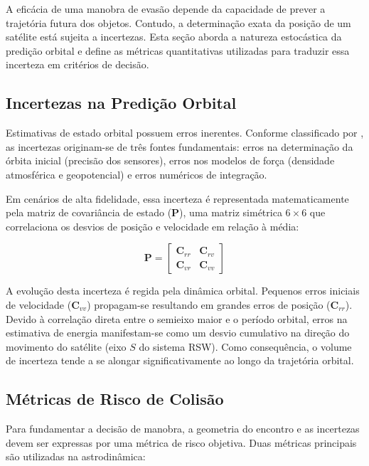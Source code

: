 A eficácia de uma manobra de evasão depende da capacidade de prever a trajetória futura dos objetos. Contudo, a determinação exata da posição de um satélite está sujeita a incertezas. Esta seção aborda a natureza estocástica da predição orbital e define as métricas quantitativas utilizadas para traduzir essa incerteza em critérios de decisão.

\subsection{Incertezas na Predição Orbital}
\label{subsec:incertezas_predicao}

Estimativas de estado orbital possuem erros inerentes. Conforme classificado por , as incertezas originam-se de três fontes fundamentais: erros na determinação da órbita inicial (precisão dos sensores), erros nos modelos de força (densidade atmosférica e geopotencial) e erros numéricos de integração.

Em cenários de alta fidelidade, essa incerteza é representada matematicamente pela matriz de covariância de estado ($\mathbf{P}$), uma matriz simétrica $6 \times 6$ que correlaciona os desvios de posição e velocidade em relação à média:

\begin{equation}
    \mathbf{P} = \begin{bmatrix}
    \mathbf{C}_{rr} & \mathbf{C}_{rv} \\
    \mathbf{C}_{vr} & \mathbf{C}_{vv}
    \end{bmatrix}
\end{equation}

A evolução desta incerteza é regida pela dinâmica orbital. Pequenos erros iniciais de velocidade ($\mathbf{C}_{vv}$) propagam-se resultando em grandes erros de posição ($\mathbf{C}_{rr}$). Devido à correlação direta entre o semieixo maior e o período orbital, erros na estimativa de energia manifestam-se como um desvio cumulativo na direção do movimento do satélite (eixo $S$ do sistema RSW). Como consequência, o volume de incerteza tende a se alongar significativamente ao longo da trajetória orbital.

\subsection{Métricas de Risco de Colisão}
\label{subsec:metricas_risco}

Para fundamentar a decisão de manobra, a geometria do encontro e as incertezas devem ser expressas por uma métrica de risco objetiva. Duas métricas principais são utilizadas na astrodinâmica:

